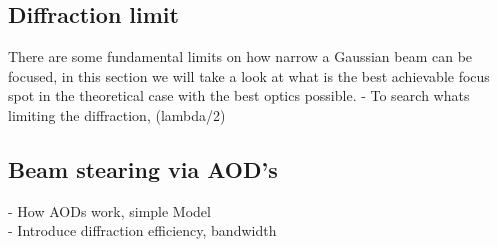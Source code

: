\subsection{Diffraction limit}
There are some fundamental limits on how narrow a Gaussian beam can be focused, in this section we will take a look at what is the best achievable focus spot in the theoretical case with the best optics possible.
- To search whats limiting the diffraction, (lambda/2)
\subsection{Beam stearing via AOD's}
- How AODs work, simple Model\\
- Introduce diffraction efficiency, bandwidth
